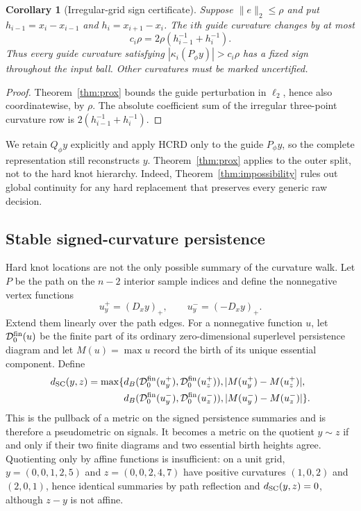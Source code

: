 \documentclass[review,onefignum,onetabnum]{siamonline250211}
\newtheorem{corollary}{Corollary}
\begin{document}
\begin{corollary}[Irregular-grid sign certificate]
Suppose $\|e\|_2\le\rho$ and put $h_{i-1}=x_i-x_{i-1}$ and
$h_i=x_{i+1}-x_i$.  The $i$th guide curvature changes by at most
\begin{equation}
c_i\rho=2\rho(h_{i-1}^{-1}+h_i^{-1}).
\end{equation}
Thus every guide curvature satisfying
$|\kappa_i(P_\phi y)|>c_i\rho$ has a fixed sign throughout the input ball.
Other curvatures must be marked uncertified.
\end{corollary}
\begin{proof}
Theorem~\ref{thm:prox} bounds the guide perturbation in $\ell_2$, hence also
coordinatewise, by $\rho$.  The absolute coefficient sum of the irregular
three-point curvature row is $2(h_{i-1}^{-1}+h_i^{-1})$.
\end{proof}

We retain $Q_\phi y$ explicitly and apply HCRD only to the guide $P_\phi y$,
so the complete representation still reconstructs $y$.  Theorem~\ref{thm:prox}
applies to the outer split, not to the hard knot hierarchy.  Indeed,
Theorem~\ref{thm:impossibility} rules out global continuity for any hard
replacement that preserves every generic raw decision.

\subsection{Stable signed-curvature persistence}
Hard knot locations are not the only possible summary of the curvature walk.
Let $P$ be the path on the $n-2$ interior sample indices and define the
nonnegative vertex functions
\begin{equation}
u_y^+=(D_xy)_+,\qquad u_y^-=(-D_xy)_+.
\end{equation}
Extend them linearly over the path edges.  For a nonnegative function $u$, let
$\mathcal D_0^{\rm fin}(u)$ be the finite part of its ordinary zero-dimensional
superlevel persistence diagram and let $M(u)=\max u$ record the birth of its
unique essential component.  Define
\begin{align}
d_{\rm SC}(y,z)=\max\{&d_B(\mathcal D_0^{\rm fin}(u_y^+),
                              \mathcal D_0^{\rm fin}(u_z^+)),
|M(u_y^+)-M(u_z^+)|,\nonumber\\
&d_B(\mathcal D_0^{\rm fin}(u_y^-),
     \mathcal D_0^{\rm fin}(u_z^-)),
|M(u_y^-)-M(u_z^-)|\}.
\end{align}
This is the pullback of a metric on the signed persistence summaries and is
therefore a pseudometric on signals.  It becomes a metric on the quotient
$y\sim z$ if and only if their two finite diagrams and two essential birth
heights agree.  Quotienting only by affine functions is insufficient: on a
unit grid, $y=(0,0,1,2,5)$ and $z=(0,0,2,4,7)$ have positive curvatures
$(1,0,2)$ and $(2,0,1)$, hence identical summaries by path reflection and
$d_{\rm SC}(y,z)=0$, although $z-y$ is not affine.
\end{document}
